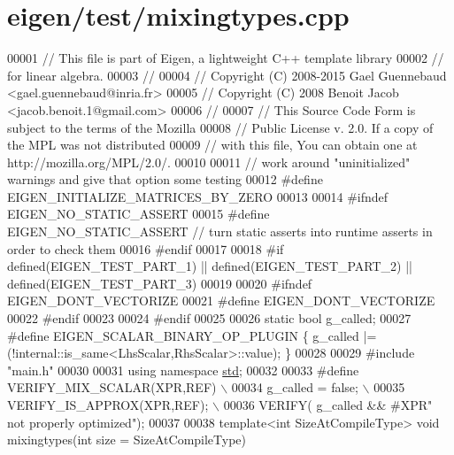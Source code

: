 \hypertarget{eigen_2test_2mixingtypes_8cpp_source}{}\section{eigen/test/mixingtypes.cpp}
\label{eigen_2test_2mixingtypes_8cpp_source}

\begin{DoxyCode}
00001 \textcolor{comment}{// This file is part of Eigen, a lightweight C++ template library}
00002 \textcolor{comment}{// for linear algebra.}
00003 \textcolor{comment}{//}
00004 \textcolor{comment}{// Copyright (C) 2008-2015 Gael Guennebaud <gael.guennebaud@inria.fr>}
00005 \textcolor{comment}{// Copyright (C) 2008 Benoit Jacob <jacob.benoit.1@gmail.com>}
00006 \textcolor{comment}{//}
00007 \textcolor{comment}{// This Source Code Form is subject to the terms of the Mozilla}
00008 \textcolor{comment}{// Public License v. 2.0. If a copy of the MPL was not distributed}
00009 \textcolor{comment}{// with this file, You can obtain one at http://mozilla.org/MPL/2.0/.}
00010 
00011 \textcolor{comment}{// work around "uninitialized" warnings and give that option some testing}
00012 \textcolor{preprocessor}{#define EIGEN\_INITIALIZE\_MATRICES\_BY\_ZERO}
00013 
00014 \textcolor{preprocessor}{#ifndef EIGEN\_NO\_STATIC\_ASSERT}
00015 \textcolor{preprocessor}{#define EIGEN\_NO\_STATIC\_ASSERT // turn static asserts into runtime asserts in order to check them}
00016 \textcolor{preprocessor}{#endif}
00017 
00018 \textcolor{preprocessor}{#if defined(EIGEN\_TEST\_PART\_1) || defined(EIGEN\_TEST\_PART\_2) || defined(EIGEN\_TEST\_PART\_3)}
00019 
00020 \textcolor{preprocessor}{#ifndef EIGEN\_DONT\_VECTORIZE}
00021 \textcolor{preprocessor}{#define EIGEN\_DONT\_VECTORIZE}
00022 \textcolor{preprocessor}{#endif}
00023 
00024 \textcolor{preprocessor}{#endif}
00025 
00026 \textcolor{keyword}{static} \textcolor{keywordtype}{bool} g\_called;
00027 \textcolor{preprocessor}{#define EIGEN\_SCALAR\_BINARY\_OP\_PLUGIN \{ g\_called |= (!internal::is\_same<LhsScalar,RhsScalar>::value); \}}
00028 
00029 \textcolor{preprocessor}{#include "main.h"}
00030 
00031 \textcolor{keyword}{using namespace }\hyperlink{namespacestd}{std};
00032 
00033 \textcolor{preprocessor}{#define VERIFY\_MIX\_SCALAR(XPR,REF) \(\backslash\)}
00034 \textcolor{preprocessor}{  g\_called = false; \(\backslash\)}
00035 \textcolor{preprocessor}{  VERIFY\_IS\_APPROX(XPR,REF); \(\backslash\)}
00036 \textcolor{preprocessor}{  VERIFY( g\_called && #XPR" not properly optimized");}
00037 
00038 \textcolor{keyword}{template}<\textcolor{keywordtype}{int} SizeAtCompileType> \textcolor{keywordtype}{void} mixingtypes(\textcolor{keywordtype}{int} size = SizeAtCompileType)

\end{DoxyCode}
